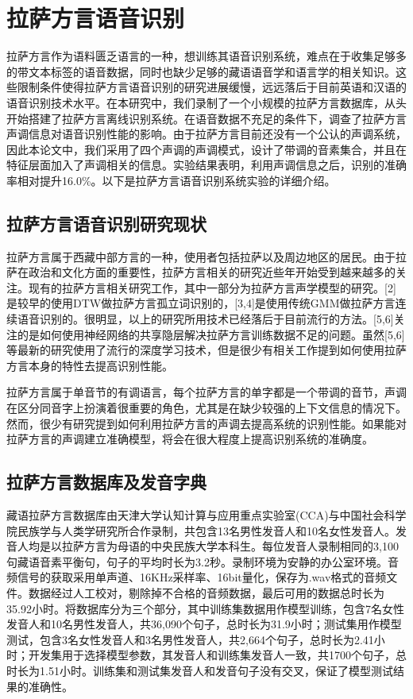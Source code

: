 ﻿%

\chapter{拉萨方言语音识别}
拉萨方言作为语料匮乏语言的一种，想训练其语音识别系统，难点在于收集足够多的带文本标签的语音数据，同时也缺少足够的藏语语音学和语言学的相关知识。这些限制条件使得拉萨方言语音识别的研究进展缓慢，远远落后于目前英语和汉语的语音识别技术水平。在本研究中，我们录制了一个小规模的拉萨方言数据库，从头开始搭建了拉萨方言离线识别系统。在语音数据不充足的条件下，调查了拉萨方言声调信息对语音识别性能的影响。由于拉萨方言目前还没有一个公认的声调系统，因此本论文中，我们采用了四个声调的声调模式，设计了带调的音素集合，并且在特征层面加入了声调相关的信息。实验结果表明，利用声调信息之后，识别的准确率相对提升16.0\%。以下是拉萨方言语音识别系统实验的详细介绍。
\section{拉萨方言语音识别研究现状}
拉萨方言属于西藏中部方言的一种，使用者包括拉萨以及周边地区的居民。由于拉萨在政治和文化方面的重要性，拉萨方言相关的研究近些年开始受到越来越多的关注。现有的拉萨方言相关研究工作，其中一部分为拉萨方言声学模型的研究。[2]是较早的使用DTW做拉萨方言孤立词识别的，[3,4]是使用传统GMM做拉萨方言连续语音识别的。很明显，以上的研究所用技术已经落后于目前流行的方法。[5,6]关注的是如何使用神经网络的共享隐层解决拉萨方言训练数据不足的问题。虽然[5,6]等最新的研究使用了流行的深度学习技术，但是很少有相关工作提到如何使用拉萨方言本身的特性去提高识别性能。

拉萨方言属于单音节的有调语言，每个拉萨方言的单字都是一个带调的音节，声调在区分同音字上扮演着很重要的角色，尤其是在缺少较强的上下文信息的情况下。然而，很少有研究提到如何利用拉萨方言的声调去提高系统的识别性能。如果能对拉萨方言的声调建立准确模型，将会在很大程度上提高识别系统的准确度。
\section{拉萨方言数据库及发音字典}
藏语拉萨方言数据库由天津大学认知计算与应用重点实验室(CCA)与中国社会科学院民族学与人类学研究所合作录制，共包含13名男性发音人和10名女性发音人。发音人均是以拉萨方言为母语的中央民族大学本科生。每位发音人录制相同的3,100句藏语音素平衡句，句子的平均时长为3.2秒。录制环境为安静的办公室环境。音频信号的获取采用单声道、16KHz采样率、16bit量化，保存为.wav格式的音频文件。数据经过人工校对，剔除掉不合格的音频数据，最后可用的数据总时长为35.92小时。将数据库分为三个部分，其中训练集数据用作模型训练，包含7名女性发音人和10名男性发音人，共36,090个句子，总时长为31.9小时；测试集用作模型测试，包含3名女性发音人和3名男性发音人，共2,664个句子，总时长为2.41小时；开发集用于选择模型参数，其发音人和训练集发音人一致，共1700个句子，总时长为1.51小时。训练集和测试集发音人和发音句子没有交叉，保证了模型测试结果的准确性。

